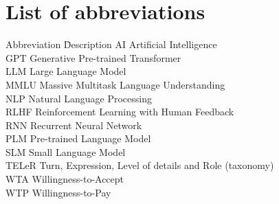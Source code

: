 \documentclass[12pt, a4paper, titlepage]{article}
\begin{document}
\newpage
\tableofcontents

\newpage
{}
\section*{List of abbreviations}
\begin{tabbing}
    Abbreviation \hspace{1cm} \= Description \kill
    AI \> Artificial Intelligence \\
    GPT \> Generative Pre-trained Transformer \\
    LLM \> Large Language Model \\
    MMLU \> Massive Multitask Language Understanding \\
    NLP \> Natural Language Processing \\
    RLHF \> Reinforcement Learning with Human Feedback \\
    RNN \> Recurrent Neural Network \\
    PLM \> Pre-trained Language Model \\
    SLM \> Small Language Model \\
    TELeR \> Turn, Expression, Level of details and Role (taxonomy) \\
    WTA \> Willingness-to-Accept \\
    WTP \> Willingness-to-Pay \\
\end{tabbing}

\newpage
{}
\renewcommand{\listtablename}{List of tables}
\listoftables
{}

\newpage
{}
\renewcommand{\listfigurename}{List of figures}
\listoffigures
{}


\clearpage
{} %


\vspace{0.5cm}






\clearpage
{} %
\setcounter{page}{7}
{}
\printbibliography
\end{document}
